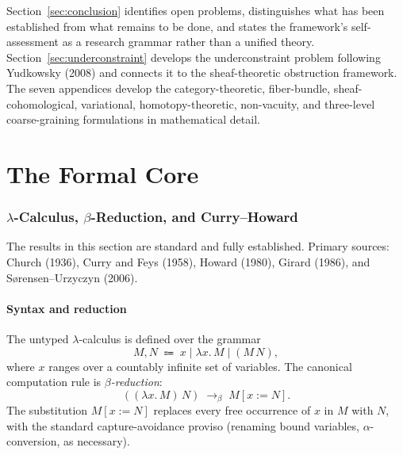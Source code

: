 \documentclass[12pt, a4paper]{article}
\theoremstyle{plain}
\theoremstyle{definition}
\theoremstyle{remark}
\newcommand{\betal}{\to_{\beta}}
\newcommand{\Lam}[2]{\lambda #1.\, #2}
\newcommand{\App}[2]{(#1\, #2)}
\newcommand{\subst}[3]{#1[#2 \mathrel{:=} #3]}
\begin{document}
Section~\ref{sec:conclusion} identifies open problems, distinguishes what
has been established from what remains to be done, and states the
framework's self-assessment as a research grammar rather than a unified
theory.
Section~\ref{sec:underconstraint} develops the underconstraint problem
following Yudkowsky (2008) and connects it to the sheaf-theoretic
obstruction framework.
The seven appendices develop the category-theoretic, fiber-bundle,
sheaf-cohomological, variational, homotopy-theoretic, non-vacuity, and
three-level coarse-graining formulations in mathematical detail.

\part{The Formal Core}

\setcounter{section}{1}

\section{$\lambda$-Calculus, $\beta$-Reduction, and Curry--Howard}
\label{sec:lambda}

\begin{established}
  The results in this section are standard and fully established.
  Primary sources: Church (1936), Curry and Feys (1958),
  Howard (1980), Girard (1986), and Sørensen--Urzyczyn (2006).
\end{established}

\subsection{Syntax and reduction}

The untyped $\lambda$-calculus is defined over the grammar
\[
  M, N \;\Coloneqq\; x \mid \Lam{x}{M} \mid \App{M}{N},
\]
where $x$ ranges over a countably infinite set of variables.
The canonical computation rule is \emph{$\beta$-reduction}:
\begin{equation}
  \App{(\Lam{x}{M})}{N} \;\betal\; \subst{M}{x}{N}.
  \label{eq:beta}
\end{equation}
The substitution $\subst{M}{x}{N}$ replaces every free occurrence of $x$
in $M$ with $N$, with the standard capture-avoidance proviso
(renaming bound variables, $\alpha$-conversion, as necessary).
\end{document}
